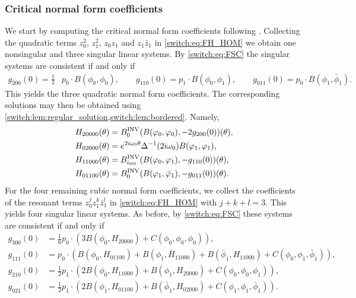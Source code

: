 \subsubsection{Critical normal form coefficients}
We start by computing the critical normal form coefficients following \cite{Janssens:Thesis}. Collecting the quadratic terms $z_{0}^{2}$, $z_{1}^{2}$, $z_{0}z_{1}$ and $z_{1}\bar{z}_{1}$ in \cref{switch:eq:FH_HOM} we obtain one nonsingular and three singular linear systems. By  \cref{switch:eq:FSC} the singular systems are consistent if and only if
\begin{align*}
g_{200}(0)=\frac{1}{2} & p_{0} \cdot B(\phi_{0},\phi_{0}),\qquad g_{110}(0)=p_{1} \cdot B(\phi_{0},\phi_{1}),\qquad g_{011}(0)=p_{0} \cdot B(\phi_{1},\bar{\phi}_{1}).
\end{align*}
This yields the three quadratic normal form coefficients. The corresponding solutions may then be obtained using \cref{switch:lem:regular_solution,switch:lem:bordered}. Namely,
\begin{align*}
H_{20000}(\theta) & = B^{\mathrm{INV}}_{0}(B(\varphi_{0},\varphi_{0}),-2g_{200}(0))(\theta),\\
H_{02000}(\theta) & = e^{2i\omega_{0}\theta}\Delta^{-1}(2i\omega_{0})B(\varphi_{1},\varphi_{1}),\\
H_{11000}(\theta) & = B^{\mathrm{INV}}_{i\omega_{0}}(B(\varphi_{0},\varphi_{1}),-g_{110}(0))(\theta),\\
H_{01100}(\theta) & = B^{\mathrm{INV}}_{0}(B(\varphi_{1},\bar{\varphi}_{1}),-g_{011}(0))(\theta).
\end{align*}
For the four remaining cubic normal form coefficients, we collect the coefficients of the resonant terms $z_{0}^{j}z_{1}^{k}\bar{z}_{1}^{l}$  in \cref{switch:eq:FH_HOM} with $j+k+l=3$. This yields four singular linear systems. As before, by \cref{switch:eq:FSC} these systems are consistent if and only if
\begin{align*}
g_{300}(0) & =\frac{1}{6}p_{0} \cdot \left(3B(\phi_{0},H_{20000})+C(\phi_{0},\phi_{0},\phi_{0})\right),\\
g_{111}(0) & =p_{0} \cdot \left(B(\phi_{0},H_{01100})+B(\phi_{1},\bar{H}_{11000})+B(\bar{\phi}_{1},H_{11000})+C(\phi_{0},\phi_{1},\bar{\phi}_{1})\right),\\
g_{210}(0) & =\frac{1}{2}p_{1} \cdot \left(2B(\phi_{0},H_{11000})+B(\phi_{1},H_{20000})+C(\phi_{0},\phi_{0},\phi_{1})\right),\\
g_{021}(0) & =\frac{1}{2}p_{1} \cdot \left(2B(\phi_{1},H_{01100})+B(\bar{\phi}_{1},H_{02000})+C(\phi_{1},\phi_{1},\bar{\phi}_{1})\right).
\end{align*}

